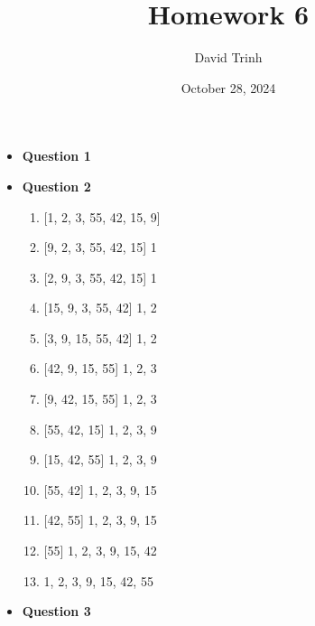\documentclass{article}
\title{Homework 6}
\author{David Trinh}
\date{October 28, 2024}
\begin{document}
\maketitle

\begin{itemize}

    \item\textbf{ Question 1}


    \item\textbf{ Question 2}

    \begin{enumerate}
        \item { [1, 2, 3, 55, 42, 15, 9] }
        \item { [9, 2, 3, 55, 42, 15] 1 }
        \item { [2, 9, 3, 55, 42, 15] 1 }
        \item { [15, 9, 3, 55, 42] 1, 2 }
        \item { [3, 9, 15, 55, 42] 1, 2 }
        \item { [42, 9, 15, 55] 1, 2, 3 }
        \item { [9, 42, 15, 55] 1, 2, 3 }
        \item { [55, 42, 15] 1, 2, 3, 9 }
        \item { [15, 42, 55] 1, 2, 3, 9 }
        \item { [55, 42] 1, 2, 3, 9, 15 }
        \item { [42, 55] 1, 2, 3, 9, 15 }
        \item { [55] 1, 2, 3, 9, 15, 42 }
        \item { 1, 2, 3, 9, 15, 42, 55 }
    \end{enumerate}
    


    \item\textbf{ Question 3}


    \begin{enumerate}


\end{enumerate}
\end{itemize}
\end{document}
